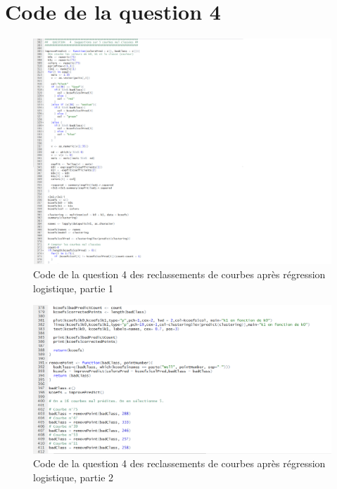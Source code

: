\documentclass[12pt]{article}
\begin{document}
\section{Code de la question 4}
\begin{figure}[H]
 \centering %
	\includegraphics[width=600px]{code_q4_1}
  \caption{\label{fig:code_q4_1} Code de la question 4 des reclassements de courbes apr\`es r\'egression logistique, partie 1}
\end{figure}
\begin{figure}[H]
 \centering %
	\includegraphics[width=600px]{code_q4_2}
  \caption{\label{fig:code_q4_2} Code de la question 4 des reclassements de courbes apr\`es r\'egression logistique, partie 2}
\end{figure}
\end{document}
